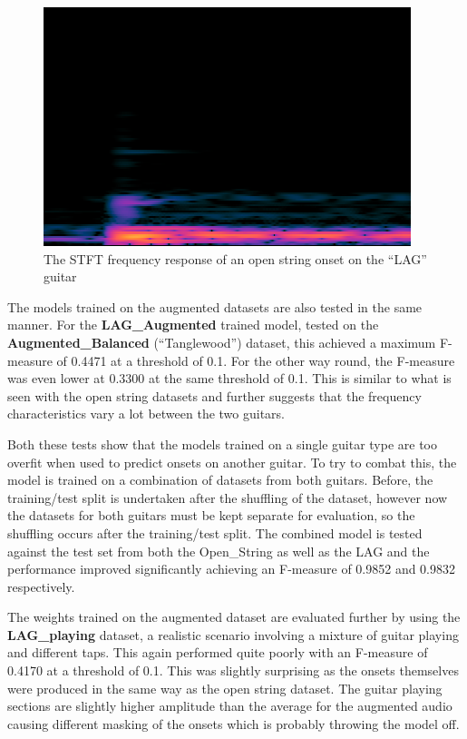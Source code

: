 \documentclass[conference]{IEEEtran}
\begin{document}
\begin{figure}[htbp]
    \centerline{\includegraphics[scale=0.4]{LAG-bridge.png}}
    \caption{The STFT frequency response of an open string onset on the ``LAG'' guitar}
    \label{LAG-bridge}
    \end{figure}
    
The models trained on the augmented datasets are also tested in the same manner. For the \textbf{LAG\_Augmented} trained model, tested on the \textbf{Augmented\_Balanced} (``Tanglewood'') dataset, this achieved a maximum F-measure of 0.4471 at a threshold of 0.1. For the other way round, the F-measure was even lower at 0.3300 at the same threshold of 0.1. This is similar to what is seen with the open string datasets
and further suggests that the frequency characteristics vary a lot between the two guitars.

Both these tests show that the models trained on a single guitar type are too overfit when used to predict onsets on another guitar. To try to combat this, the model is trained on a combination of datasets from both guitars. Before, the training/test split is undertaken after the shuffling of the dataset,
however now the datasets for both guitars must be kept separate for evaluation, so the shuffling occurs after the training/test split. The combined model is tested against the test set from both the Open\_String as well as the LAG and the performance improved significantly achieving 
an F-measure of 0.9852 and 0.9832 respectively.

The weights trained on the augmented dataset are evaluated further by using the \textbf{LAG\_playing} dataset, a realistic scenario involving a mixture of guitar playing and different taps. This again performed quite poorly with an F-measure of 0.4170 at a threshold of 0.1. This was slightly surprising as the onsets themselves
were produced in the same way as the open string dataset. The guitar playing sections are slightly higher amplitude than the average for the augmented audio causing different masking of the onsets which is probably throwing the model off.
\end{document}
